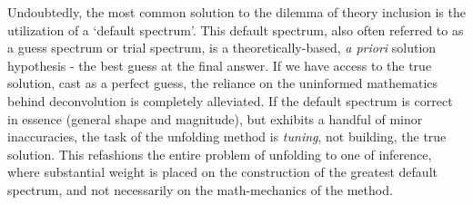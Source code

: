 Undoubtedly, the most common solution to the dilemma of theory inclusion is the utilization of a `default spectrum'.
This default spectrum, also often referred to as a guess spectrum or trial spectrum, is a theoretically-based, {\it a priori} solution hypothesis - the best guess at the final answer.
If we have access to the true solution, cast as a perfect guess, the reliance on the uninformed mathematics behind deconvolution is completely alleviated.
If the default spectrum is correct in essence (general shape and magnitude), but exhibits a handful of minor inaccuracies, the task of the unfolding method is {\it tuning}, not building, the true solution.
This refashions the entire problem of unfolding to one of inference, where substantial weight is placed on the construction of the greatest default spectrum, and not necessarily on the math-mechanics of the method.

